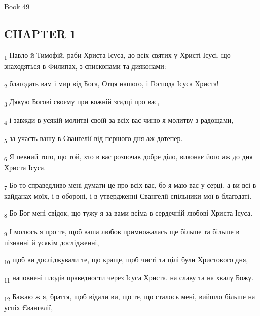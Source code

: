 Book 49
\subsection{CHAPTER 1}
\begin{tcolorbox}
\textsubscript{1} Павло й Тимофій, раби Христа Ісуса, до всіх святих у Христі Ісусі, що знаходяться в Филипах, з єпископами та дияконами:
\end{tcolorbox}
\begin{tcolorbox}
\textsubscript{2} благодать вам і мир від Бога, Отця нашого, і Господа Ісуса Христа!
\end{tcolorbox}
\begin{tcolorbox}
\textsubscript{3} Дякую Богові своєму при кожній згадці про вас,
\end{tcolorbox}
\begin{tcolorbox}
\textsubscript{4} і завжди в усякій молитві своїй за всіх вас чиню я молитву з радощами,
\end{tcolorbox}
\begin{tcolorbox}
\textsubscript{5} за участь вашу в Євангелії від першого дня аж дотепер.
\end{tcolorbox}
\begin{tcolorbox}
\textsubscript{6} Я певний того, що той, хто в вас розпочав добре діло, виконає його аж до дня Христа Ісуса.
\end{tcolorbox}
\begin{tcolorbox}
\textsubscript{7} Бо то справедливо мені думати це про всіх вас, бо я маю вас у серці, а ви всі в кайданах моїх, і в обороні, і в утвердженні Євангелії спільники мої в благодаті.
\end{tcolorbox}
\begin{tcolorbox}
\textsubscript{8} Бо Бог мені свідок, що тужу я за вами всіма в сердечній любові Христа Ісуса.
\end{tcolorbox}
\begin{tcolorbox}
\textsubscript{9} І молюсь я про те, щоб ваша любов примножалась ще більше та більше в пізнанні й усякім дослідженні,
\end{tcolorbox}
\begin{tcolorbox}
\textsubscript{10} щоб ви досліджували те, що краще, щоб чисті та цілі були Христового дня,
\end{tcolorbox}
\begin{tcolorbox}
\textsubscript{11} наповнені плодів праведности через Ісуса Христа, на славу та на хвалу Божу.
\end{tcolorbox}
\begin{tcolorbox}
\textsubscript{12} Бажаю ж я, браття, щоб відали ви, що те, що сталось мені, вийшло більше на успіх Євангелії,
\end{tcolorbox}
